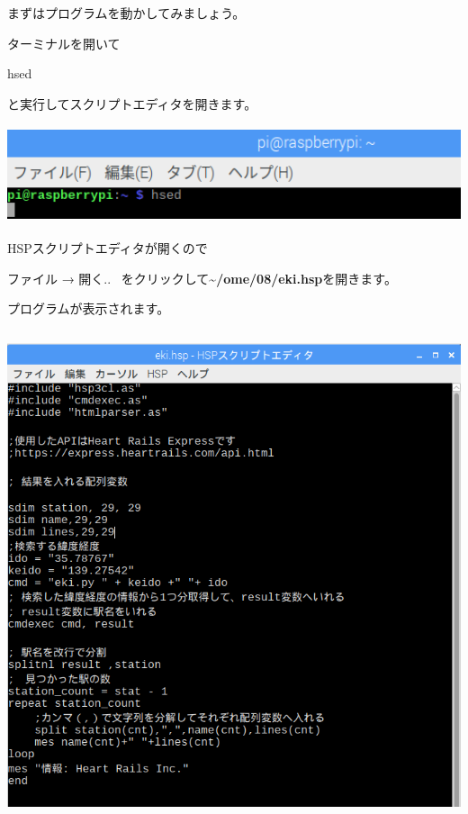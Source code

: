 \documentclass[a4paper,12pt,dvipdfmx]{jarticle}
\begin{document}
\bigskip


\bigskip

\clearpage
まずはプログラムを動かしてみましょう。

ターミナルを開いて

hsed

と実行してスクリプトエディタを開きます。



\begin{center}
\includegraphics[width=17.057cm,height=2.866cm]{textbook-img013.png}

\end{center}
HSPスクリプトエディタが開くので

ファイル → 開く..
\ をクリックして\textbf{\~{}/ome/08/eki.hsp}を開きます。

プログラムが表示されます。



\begin{center}
\includegraphics[width=13.377cm,height=14.356cm]{textbook-img050.png}

\end{center}
\end{document}
